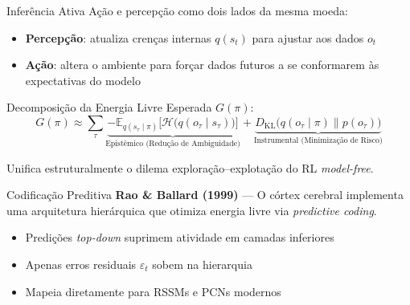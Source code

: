 \documentclass[aspectratio=169]{beamer}
\begin{document}
\begin{frame}{Inferência Ativa}
  Ação e percepção como dois lados da mesma moeda:
  \begin{itemize}
    \item \textbf{Percepção}: atualiza crenças internas $q(s_t)$ para ajustar aos dados $o_t$
    \item \textbf{Ação}: altera o ambiente para forçar dados futuros a se conformarem às expectativas do modelo
  \end{itemize}

  \vspace{0.5em}
  Decomposição da Energia Livre Esperada $G(\pi)$:
  \begin{equation}
    G(\pi) \approx \sum_\tau
      \underbrace{-\mathbb{E}_{q(s_\tau \mid \pi)}\bigl[\mathcal{H}\bigl(q(o_\tau \mid s_\tau)\bigr)\bigr]}_{\text{Epistêmico (Redução de Ambiguidade)}}
      + \underbrace{D_{\mathrm{KL}}\bigl(q(o_\tau \mid \pi) \parallel p(o_\tau)\bigr)}_{\text{Instrumental (Minimização de Risco)}}
  \end{equation}

  \vspace{0.3em}
  Unifica estruturalmente o dilema exploração--explotação do RL \textit{model-free}.
\end{frame}

\begin{frame}{Codificação Preditiva}
  \textbf{Rao \& Ballard (1999)} --- O córtex cerebral implementa uma arquitetura hierárquica que otimiza energia livre via \textit{predictive coding}.

  \vspace{0.3em}
  \begin{center}
  \end{center}

  \vspace{0.3em}
  \begin{itemize}
    \item Predições \textit{top-down} suprimem atividade em camadas inferiores
    \item Apenas erros residuais $\varepsilon_t$ sobem na hierarquia
    \item Mapeia diretamente para RSSMs e PCNs modernos
  \end{itemize}
\end{frame}
\end{document}
